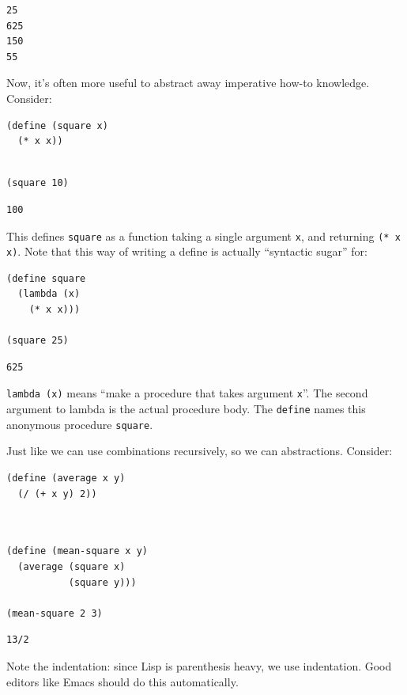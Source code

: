\documentclass[9pt]{report}
\begin{document}
\begin{verbatim}
25
625
150
55
\end{verbatim}


Now, it's often more useful to abstract away imperative how-to
knowledge. Consider:

\begin{verbatim}
(define (square x)
  (* x x))
\end{verbatim}

\begin{verbatim}

(square 10)
\end{verbatim}

\begin{verbatim}
100
\end{verbatim}


This defines \texttt{square} as a function taking a single argument \texttt{x},
and returning \texttt{(* x x)}. Note that this way of writing a define is
actually ``syntactic sugar'' for:

\begin{verbatim}
(define square
  (lambda (x)
    (* x x)))

(square 25)
\end{verbatim}

\begin{verbatim}
625
\end{verbatim}


\texttt{lambda (x)} means ``make a procedure that takes argument \texttt{x}''. The
second argument to lambda is the actual procedure body. The
\texttt{define} names this anonymous procedure \texttt{square}.

Just like we can use combinations recursively, so we can
abstractions. Consider:

\begin{verbatim}
(define (average x y)
  (/ (+ x y) 2))
\end{verbatim}

\begin{verbatim}


(define (mean-square x y)
  (average (square x)
           (square y)))

(mean-square 2 3)
\end{verbatim}

\begin{verbatim}
13/2
\end{verbatim}


Note the indentation: since Lisp is parenthesis heavy, we use
indentation. Good editors like Emacs should do this automatically.
\end{document}
